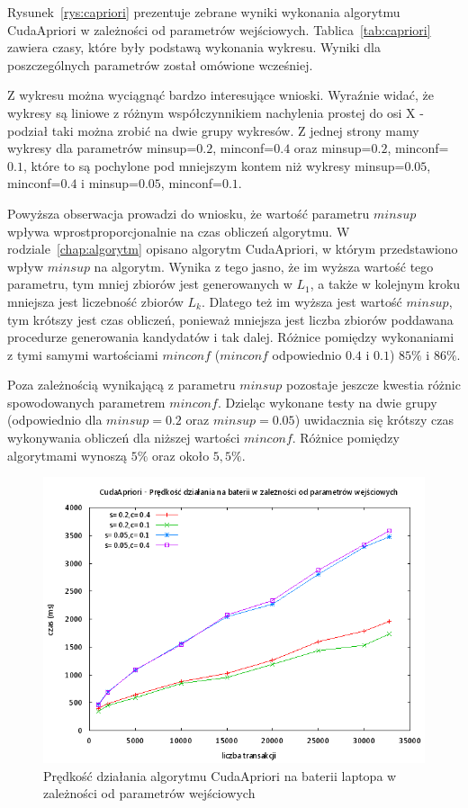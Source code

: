 Rysunek~\ref{rys:capriori} prezentuje zebrane wyniki wykonania algorytmu CudaApriori w zależności od parametrów wejściowych. Tablica~\ref{tab:capriori} zawiera czasy, które były podstawą wykonania wykresu. Wyniki dla poszczególnych parametrów został omówione wcześniej. 

Z wykresu można wyciągnąć bardzo interesujące wnioski. Wyraźnie widać, że wykresy są liniowe z różnym współczynnikiem nachylenia prostej do osi X - podział taki można zrobić na dwie grupy wykresów. Z jednej strony mamy wykresy dla parametrów minsup=$0.2$, minconf=$0.4$ oraz minsup=$0.2$, minconf=$0.1$, które to są pochylone pod mniejszym kontem niż wykresy minsup=$0.05$, minconf=$0.4$ i minsup=$0.05$, minconf=$0.1$. 

Powyższa obserwacja prowadzi do wniosku, że wartość parametru $minsup$ wpływa wprostproporcjonalnie na czas obliczeń algorytmu. W rodziale~\ref{chap:algorytm} opisano algorytm CudaApriori, w którym przedstawiono wpływ $minsup$ na algorytm. Wynika z tego jasno, że im wyższa wartość tego parametru, tym mniej zbiorów jest generowanych w $L_1$, a także w kolejnym kroku mniejsza jest liczebność zbiorów $L_k$. Dlatego też im wyższa jest wartość $minsup$, tym krótszy jest czas obliczeń, ponieważ mniejsza jest liczba zbiorów poddawana procedurze generowania kandydatów i tak dalej. Różnice pomiędzy wykonaniami z tymi samymi wartościami $minconf$ ($minconf$ odpowiednio $0.4$ i $0.1$) $85\%$ i $86\%$.

Poza zależnością wynikającą z parametru $minsup$ pozostaje jeszcze kwestia różnic spowodowanych parametrem $minconf$. Dzieląc wykonane testy na dwie grupy (odpowiednio dla $minsup=0.2$ oraz $minsup=0.05$) uwidacznia się krótszy czas wykonywania obliczeń dla niższej wartości $minconf$. Różnice pomiędzy algorytmami wynoszą $5\%$ oraz około $5,5\%$. 

\begin{figure}[H]
\centering
\includegraphics[width=1.1\textwidth]{figures/06/capriori_bat.png}
\caption{Prędkość działania algorytmu CudaApriori na baterii laptopa w zależności od parametrów wejściowych\label{rys:capriori_bat}}
\end{figure}

